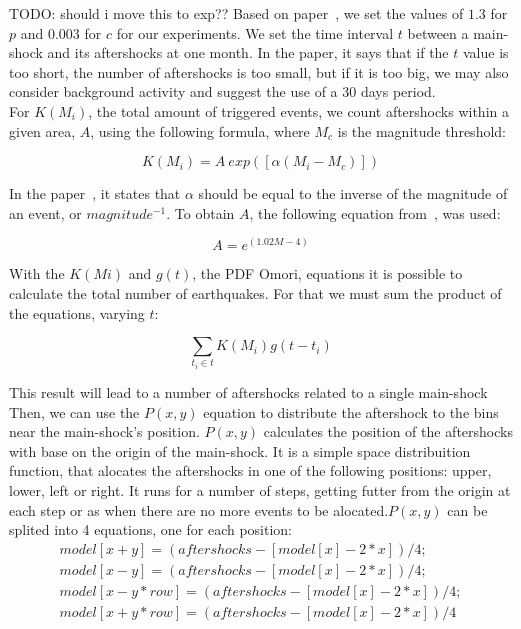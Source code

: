 TODO: should i move this to exp??
Based on paper~\cite{yamanaka1990scaling}, we set the values of $1.3$ for $p$ and $0.003$ for $c$ for our experiments. We set the time interval $t$ between a main-shock and its aftershocks at one month. In the paper, it says that if the $t$ value is too short, the number of aftershocks is too small, but if it is too big, we may also consider background activity and suggest the use of a 30 days period.\\

For $K(M_i)$, the total amount of triggered events, we count aftershocks within a given area, $A$, using the following formula, where $M_c$ is the magnitude threshold:

\begin{equation}\label{triggered}
 K(M_i) = A\ exp([\alpha(M_i-M_c)])
\end{equation}

In the paper~\cite{ogata2006space}, it states that $\alpha$ should be equal to the inverse of the magnitude of an event, or $magnitude^{-1}$. To obtain $A$, the following equation from~\cite{yamanaka1990scaling}, was used:

\begin{equation}
A = e^{(1.02M -4)}
\end{equation}

With the $K(Mi)$ and $g(t)$, the PDF Omori, equations it is possible to calculate the total number of earthquakes. For that we must sum the product of the equations, varying $t$:

\begin{equation}
\displaystyle\sum_{t_i \in t} K(M_i)g(t-t_i)
\end{equation}

This result will lead to a number of aftershocks related to a single main-shock Then, we can use the $P(x,y)$ equation to distribute the aftershock to the bins near the main-shock’s position.  $P(x,y)$ calculates the position of the aftershocks with base on the origin of the main-shock. It is a simple space distribuition function, that alocates the aftershocks in one of the following positions: upper, lower, left or right. It runs for a number of steps, getting futter from the origin at each step or as when there are no more events to be alocated.$P(x,y)$ can be splited into 4 equations, one for each position:\\

\begin{subequations}
\begin{gather*}
        model[x+y] = (aftershocks-[model[x]-2*x])/4;\\
        model[x-y] = (aftershocks-[model[x]-2*x])/4;\\
        model[x-y*row] = (aftershocks-[model[x]-2*x])/4;\\
        model[x+y*row] = (aftershocks-[model[x]-2*x])/4
\end{gather*}
\end{subequations}


